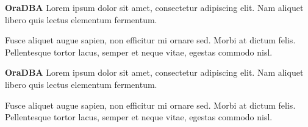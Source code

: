 \documentclass[
  a4paper,
  ,captions=tableheading
]{scrartcl}
\begin{document}
\begin{importantblock}
\textbf{OraDBA} Lorem ipsum dolor sit amet, consectetur adipiscing elit.
Nam aliquet libero quis lectus elementum fermentum.

Fusce aliquet augue sapien, non efficitur mi ornare sed. Morbi at dictum
felis. Pellentesque tortor lacus, semper et neque vitae, egestas commodo
nisl.
\end{importantblock}

\begin{importantblock}
\textbf{OraDBA} Lorem ipsum dolor sit amet, consectetur adipiscing elit.
Nam aliquet libero quis lectus elementum fermentum.

Fusce aliquet augue sapien, non efficitur mi ornare sed. Morbi at dictum
felis. Pellentesque tortor lacus, semper et neque vitae, egestas commodo
nisl.
\end{importantblock}
\end{document}
